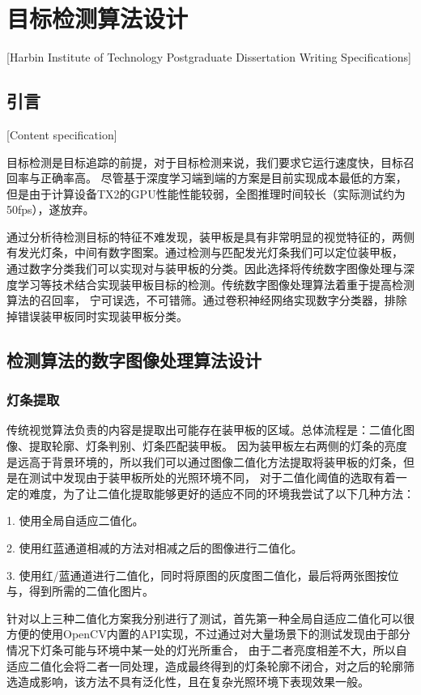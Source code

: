 
\chapter[目标检测算法设计]{目标检测算法设计}[Harbin Institute of Technology Postgraduate Dissertation Writing Specifications]



\section{引言}[Content specification]

目标检测是目标追踪的前提，对于目标检测来说，我们要求它运行速度快，目标召回率与正确率高。
尽管基于深度学习端到端的方案是目前实现成本最低的方案，但是由于计算设备TX2的GPU性能性能较弱，全图推理时间较长（实际测试约为50fps），遂放弃。
\par
通过分析待检测目标的特征不难发现，装甲板是具有非常明显的视觉特征的，两侧有发光灯条，中间有数字图案。通过检测与匹配发光灯条我们可以定位装甲板，
通过数字分类我们可以实现对与装甲板的分类。因此选择将传统数字图像处理与深度学习等技术结合实现装甲板目标的检测。传统数字图像处理算法着重于提高检测算法的召回率，
宁可误选，不可错筛。通过卷积神经网络实现数字分类器，排除掉错误装甲板同时实现装甲板分类。




\section{检测算法的数字图像处理算法设计}

\subsection{灯条提取}
传统视觉算法负责的内容是提取出可能存在装甲板的区域。总体流程是：二值化图像、提取轮廓、灯条判别、灯条匹配装甲板。
因为装甲板左右两侧的灯条的亮度是远高于背景环境的，所以我们可以通过图像二值化方法提取将装甲板的灯条，但是在测试中发现由于装甲板所处的光照环境不同，
对于二值化阈值的选取有着一定的难度，为了让二值化提取能够更好的适应不同的环境我尝试了以下几种方法：\par
1. 使用全局自适应二值化。\par
2. 使用红蓝通道相减的方法对相减之后的图像进行二值化。\par
3. 使用红/蓝通道进行二值化，同时将原图的灰度图二值化，最后将两张图按位与，得到所需的二值化图片。\par

针对以上三种二值化方案我分别进行了测试，首先第一种全局自适应二值化可以很方便的使用OpenCV内置的API实现，不过通过对大量场景下的测试发现由于部分情况下灯条可能与环境中某一处的灯光所重合，
由于二者亮度相差不大，所以自适应二值化会将二者一同处理，造成最终得到的灯条轮廓不闭合，对之后的轮廓筛选造成影响，该方法不具有泛化性，且在复杂光照环境下表现效果一般。\par

